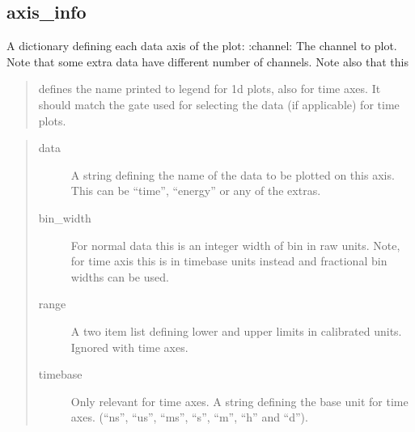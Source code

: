 \documentclass[letterpaper,10pt,english]{sphinxmanual}
\begin{document}
\subsection{axis\_info}
\label{\detokenize{manual/configuration:axis-info}}
\sphinxAtStartPar
A dictionary defining each data axis of the plot:
:channel:       The channel to plot. Note that some extra data have different number of channels. Note also that this
\begin{quote}

\sphinxAtStartPar
defines the name printed to legend for 1d plots, also for time axes. It should match the gate used
for selecting the data (if applicable) for time plots.
\end{quote}
\begin{quote}\begin{description}
\item[{data}] \leavevmode
\sphinxAtStartPar
A string defining the name of the data to be plotted on this axis. This can be “time”, “energy” or any of
the extras.

\item[{bin\_width}] \leavevmode
\sphinxAtStartPar
For normal data this is an integer width of bin in raw units. Note, for time axis this is in timebase
units instead and fractional bin widths can be used.

\item[{range}] \leavevmode
\sphinxAtStartPar
A two item list defining lower and upper limits in calibrated units. Ignored with time axes.

\item[{timebase}] \leavevmode
\sphinxAtStartPar
Only relevant for time axes. A string defining the base unit for time axes.
(“ns”, “us”, “ms”, “s”, “m”, “h” and “d”).

\end{description}\end{quote}
\end{document}
